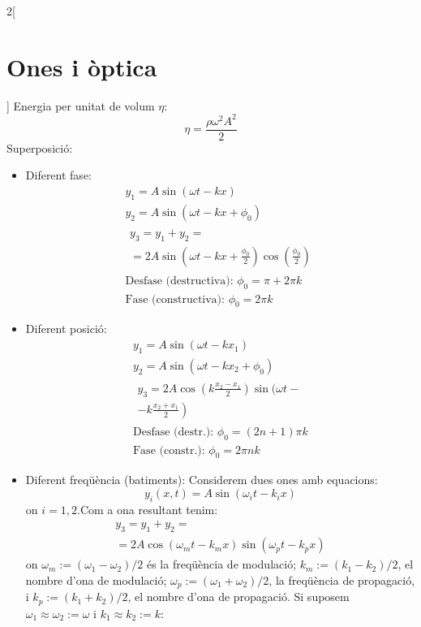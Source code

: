 \documentclass[../../../main.tex]{subfiles}
\begin{document}
\begin{multicols}{2}[\section{Ones i òptica}]
Energia per unitat de volum $\eta$:
$$\eta=\frac{\rho\omega^2A^2}{2}$$
Superposició:
\begin{itemize}
    \item Diferent fase:
    \begin{gather*}
        y_1=A\sin(\omega t- kx)\\
        y_2=A\sin(\omega t- kx+\phi_0)\\
        \begin{split}
            y_3=y_1+y_2=\qquad\qquad\qquad\qquad\\=2A\sin\left(\omega t-kx+\frac{\phi_0}{2}\right)\cos\left(\frac{\phi_0}{2}\right)
        \end{split}\\
        \text{Desfase (destructiva): }\phi_0=\pi+2\pi k\\
        \text{Fase (constructiva): }\phi_0=2\pi k
    \end{gather*}
    \item Diferent posició:
    \begin{gather*}
        y_1=A\sin(\omega t- kx_1)\\
        y_2=A\sin(\omega t- kx_2+\phi_0)\\
        \begin{split}
        y_3=2A\cos\left(k\frac{x_2-x_1}{2}\right)\sin\bigg(\omega t-\\\left.-k\frac{x_2+x_1}{2}\right)
        \end{split}\\
        \text{Desfase (destr.): }\phi_0=(2n+1)\pi k\\
        \text{Fase (constr.): }\phi_0=2\pi nk
    \end{gather*}
    \item Diferent freqüència (batiments):\newline
    Considerem dues ones amb equacions: $$y_i(x,t)=A\sin(\omega_it-k_ix)$$ {\footnotesize on $i=1,2$.}\newline Com a ona resultant tenim:
    \begin{multline*}
        y_3=y_1+y_2=\\=2A\cos(\omega_mt-k_mx)\sin(\omega_pt-k_px) 
    \end{multline*}{\footnotesize on $\omega_m:=(\omega_1-\omega_2)/2$ és la freqüència de modulació; $k_m:=(k_1-k_2)/2$, el nombre d'ona de modulació; $\omega_p:=(\omega_1+\omega_2)/2$, la freqüència de propagació, i $k_p:=(k_1+k_2)/2$, el nombre d'ona de propagació.}\newline
    Si suposem $\omega_1\approx\omega_2:=\omega$ i $k_1\approx k_2:=k$:\newline

\end{itemize}
\end{multicols}
\end{document}
